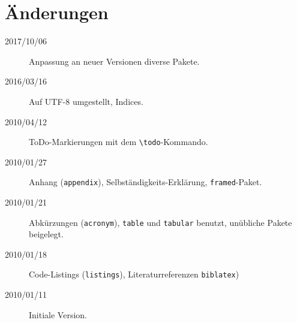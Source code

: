 
\chapter*{Änderungen}

\begin{description}
    \item[2017/10/06] Anpassung an neuer Versionen diverse Pakete.
    \item[2016/03/16] Auf UTF-8 umgestellt, Indices.
    \item[2010/04/12] ToDo-Markierungen mit dem \verb+\todo+-Kommando.
    \item[2010/01/27] Anhang (\texttt{appendix}), Selbständigkeits-Erklärung, \texttt{framed}-Paket.
    \item[2010/01/21] Abkürzungen (\texttt{acronym}), \texttt{table} und \texttt{tabular} benutzt, unübliche Pakete beigelegt.
    \item[2010/01/18] Code-Listings (\texttt{listings}), Literaturreferenzen \texttt{biblatex})
    \item[2010/01/11] Initiale Version.
\end{description}

